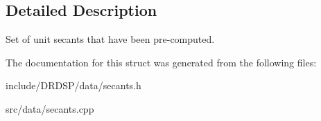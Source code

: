 \subsection{Detailed Description}
Set of unit secants that have been pre-\/computed. 

The documentation for this struct was generated from the following files\-:\begin{DoxyCompactItemize}
\item 
include/\-D\-R\-D\-S\-P/data/secants.\-h\item 
src/data/secants.\-cpp\end{DoxyCompactItemize}
